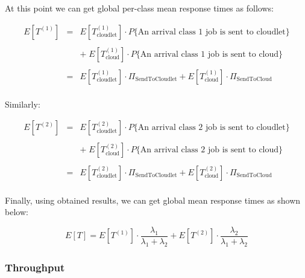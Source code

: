 \documentclass[10pt,a4paper]{article}
\begin{document}
At this point we can get global per-class mean response times as follows:

\begin{equation}
\begin{array} {lcl} 
E[T^{(1)}] & = & E[T_{\text{cloudlet}}^{(1)}] \cdot P\lbrace\text{An arrival class 1 job is sent to cloudlet}\rbrace \\
\\
& & +\; E[T_{\text{cloud}}^{(1)}] \cdot P\lbrace\text{An arrival class 1 job is sent to cloud}\rbrace \\
\\
& = & E[T_{\text{cloudlet}}^{(1)}] \cdot \Pi_{\text{SendToCloudlet}} + E[T_{\text{cloud}}^{(1)}] \cdot \Pi_{\text{SendToCloud}} \\

\end{array}
\end{equation}

Similarly:

\begin{equation}
\begin{array} {lcl} 
E[T^{(2)}] & = & E[T_{\text{cloudlet}}^{(2)}] \cdot P\lbrace\text{An arrival class 2 job is sent to cloudlet}\rbrace \\
\\
& & +\; E[T_{\text{cloud}}^{(2)}] \cdot P\lbrace\text{An arrival class 2 job is sent to cloud}\rbrace \\
\\
& = & E[T_{\text{cloudlet}}^{(2)}] \cdot \Pi_{\text{SendToCloudlet}} + E[T_{\text{cloud}}^{(2)}] \cdot \Pi_{\text{SendToCloud}} \\

\end{array}
\end{equation}

Finally, using obtained results, we can get global mean response times as shown below:

\begin{equation}
E[T] = E[T^{(1)}] \cdot \dfrac{\lambda_1}{\lambda_1 + \lambda_2} + E[T^{(2)}] \cdot \dfrac{\lambda_2}{\lambda_1 + \lambda_2}
\end{equation}

\subsubsection{Throughput}
\end{document}
